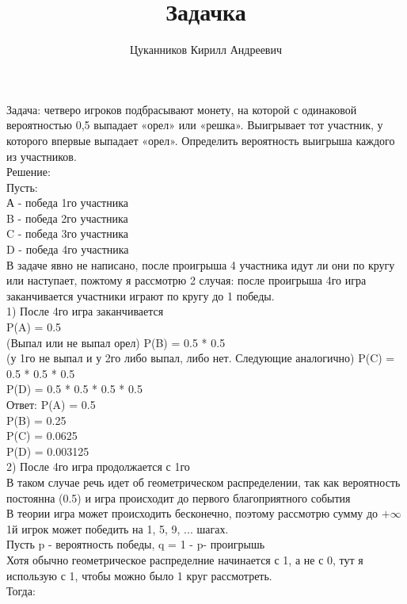 \documentclass[fleqn]{article}
\begin{document}
\title{Задачка}
\author{Цуканников Кирилл Андреевич}
\maketitle

\newpage
Задача: четверо игроков подбрасывают монету, на которой с одинаковой вероятностью 0,5 выпадает «орел» или «решка». Выигрывает тот участник, у которого впервые выпадает «орел». Определить вероятность выигрыша каждого из участников. \\
Решение: \\
Пусть:\\
 А - победа 1го участника \\
 B - победа 2го участника \\
 C - победа 3го участника \\
 D - победа 4го участника \\
В задаче явно не написано, после проигрыша 4 участника идут ли они по кругу или наступает, пожтому я рассмотрю 2 случая: после проигрыша 4го игра заканчивается участники играют по кругу до 1 победы. \\
1) После 4го игра заканчивается \\
P(A) = 0.5 \\ (Выпал или не выпал орел)
P(B) = 0.5 * 0.5 \\(у 1го не выпал и у 2го либо выпал, либо нет. Следующие аналогично)
P(C) = 0.5 * 0.5 * 0.5 \\
P(D) = 0.5 * 0.5 * 0.5 * 0.5 \\
Ответ: P(A) = 0.5 \\
P(B) = 0.25 \\
P(C) = 0.0625 \\
P(D) = 0.003125 \\
2) После 4го игра продолжается с 1го \\
В таком случае речь идет об геометрическом распределении, так как вероятность постоянна (0.5) и игра происходит до первого благоприятного события \\
В теории игра может происходить бесконечно, поэтому рассмотрю сумму до $+\infty$ \\
1й игрок может победить на 1, 5, 9, ... шагах. \\
Пусть  p - вероятность победы, q = 1 - p- проигрышь \\
Хотя обычно геометрическое распределние начинается с 1, а не с 0, тут я использую с 1, чтобы можно было 1 круг рассмотреть. \\
Тогда: \\
\end{document}
